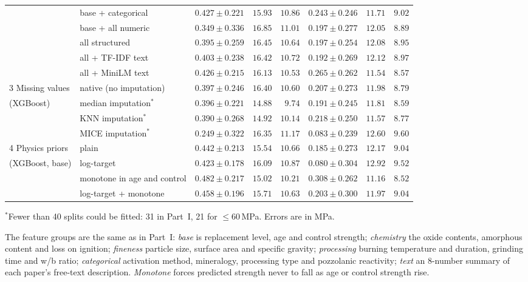 \documentclass[11pt]{article}
\begin{document}
\begin{table}[tbp]
\begin{adjustbox}{max width=\linewidth}
\begin{tabular}{llrrrrrr}
 & base + categorical & $0.427\pm0.221$ & $15.93$ & $10.86$ & $0.243\pm0.246$ & $11.71$ & $9.02$ \\
 & base + all numeric & $0.349\pm0.336$ & $16.85$ & $11.01$ & $0.197\pm0.277$ & $12.05$ & $8.89$ \\
 & all structured & $0.395\pm0.259$ & $16.45$ & $10.64$ & $0.197\pm0.254$ & $12.08$ & $8.95$ \\
 & all + TF-IDF text & $0.403\pm0.238$ & $16.42$ & $10.72$ & $0.192\pm0.269$ & $12.12$ & $8.97$ \\
 & all + MiniLM text & $0.426\pm0.215$ & $16.13$ & $10.53$ & $\mathbf{0.265\pm0.262}$ & $\mathbf{11.54}$ & $\mathbf{8.57}$ \\
\midrule
3 Missing values & native (no imputation) & $\mathbf{0.397\pm0.246}$ & $16.40$ & $10.60$ & $0.207\pm0.273$ & $11.98$ & $8.79$ \\
\quad (XGBoost) & median imputation$^{*}$ & $0.396\pm0.221$ & $\mathbf{14.88}$ & $\mathbf{9.74}$ & $0.191\pm0.245$ & $11.81$ & $\mathbf{8.59}$ \\
 & KNN imputation$^{*}$ & $0.390\pm0.268$ & $14.92$ & $10.14$ & $\mathbf{0.218\pm0.250}$ & $\mathbf{11.57}$ & $8.77$ \\
 & MICE imputation$^{*}$ & $0.249\pm0.322$ & $16.35$ & $11.17$ & $0.083\pm0.239$ & $12.60$ & $9.60$ \\
\midrule
4 Physics priors & plain & $0.442\pm0.213$ & $15.54$ & $10.66$ & $0.185\pm0.273$ & $12.17$ & $9.04$ \\
\quad (XGBoost, base) & log-target & $0.423\pm0.178$ & $16.09$ & $10.87$ & $0.080\pm0.304$ & $12.92$ & $9.52$ \\
 & monotone in age and control & $\mathbf{0.482\pm0.217}$ & $\mathbf{15.02}$ & $\mathbf{10.21}$ & $\mathbf{0.308\pm0.262}$ & $\mathbf{11.16}$ & $\mathbf{8.52}$ \\
 & log-target + monotone & $0.458\pm0.196$ & $15.71$ & $10.63$ & $0.203\pm0.300$ & $11.97$ & $9.04$ \\
\bottomrule
\end{tabular}
\end{adjustbox}

\vspace{2pt}
{\footnotesize $^{*}$Fewer than 40 splits could be fitted: 31 in Part~I, 21 for
$\leq60$\,MPa. Errors are in MPa.}
\end{table}

\noindent The feature groups are the same as in Part~I: \emph{base} is replacement
level, age and control strength; \emph{chemistry} the oxide contents, amorphous content
and loss on ignition; \emph{fineness} particle size, surface area and specific gravity;
\emph{processing} burning temperature and duration, grinding time and w/b ratio;
\emph{categorical} activation method, mineralogy, processing type and pozzolanic
reactivity; \emph{text} an 8-number summary of each paper's free-text description.
\emph{Monotone} forces predicted strength never to fall as age or control strength rise.
\end{document}
